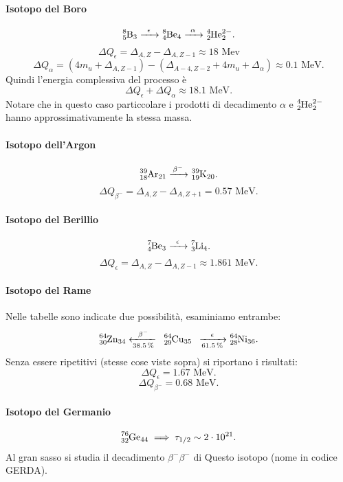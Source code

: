 \paragraph{Isotopo del Boro}
\label{par:8B}
\[
	\ce{\ce{^{8}_{5}B_{3}} ->[\epsilon] \ce{^{8}_{4}\text{Be}_{4}} ->[\alpha] \ce{^{4}_{2}\text{He}^{2-}_{2}} } 
.\]
\[
	\Delta Q_{\epsilon} = \Delta_{A, Z} - \Delta_{A, Z-1} \approx 18 \text{ Mev} \quad \quad  
\]
\[
	\Delta Q_{\alpha} = ( 4m_u +  \Delta_{A,Z-1}) - \left( \Delta_{A-4, Z-2} + 4m_u + \Delta _{\alpha} \right) \approx 0.1 \text{ MeV}
.\] 
Quindi l'energia complessiva del processo è 
\[
	\Delta Q_{\epsilon}+ \Delta Q_{\alpha} \approx 18.1 \text{ MeV}.
\]
Notare che in questo caso particcolare i prodotti di decadimento $\alpha$ e $\ce{^{4}_{2}\text{He}^{2-}_{2}}$ hanno approssimativamente la stessa massa.
\paragraph{Isotopo dell'Argon}
\label{par:39Ar}
\[
	\ce{\ce{^{39}_{18}\text{Ar}_{21}}  ->[\beta^-] \ce{^{39}_{19}K_{20}}}
.\] 
\[
	\Delta Q_{\beta^-} = \Delta_{A,Z} - \Delta_{A, Z+1} = 0.57 \text{ MeV} 
.\] 
\paragraph{Isotopo del Berillio}%
\label{par:7Be}
\[
	\ce{\ce{^{7}_{4}\text{Be}_{3}} ->[\epsilon] \ce{^{7}_{3}\text{Li}_{4}} }
.\] 
\[
\Delta Q_{\epsilon} = \Delta_{A, Z} - \Delta_{A, Z-1} \approx 1.861 \text{ MeV}
.\] 
\paragraph{Isotopo del Rame}%
\label{par:64Cu}
Nelle tabelle sono indicate due possibilità, esaminiamo entrambe:
\[
	\ce{ \ce{^{64}_{30}\text{Zn}_{34}} <-[\beta^-][38.5 \%] \text{ } \ce{^{64}_{29}\text{Cu}_{35}} \text{ } ->[\epsilon][61.5\%] \ce{^{64}_{28}\text{Ni}_{36}} }
.\] 
Senza essere ripetitivi (stesse cose viste sopra) si riportano i risultati:
\[
\Delta Q_{\epsilon} = 1.67 \text{ MeV}
.\] 
\[
\Delta Q_{\beta^-} = 0.68 \text{ MeV}
.\] 

\paragraph{Isotopo del Germanio}%
\label{par:76Ge}
\[
	\ce{^{76}_{32}\text{Ge}_{44}} \implies \tau_{1 /2} \sim 2 \cdot 10^{21} 
.\]
Al gran sasso si studia il decadimento $\beta^- \beta^-$ di Questo isotopo (nome in codice GERDA).

